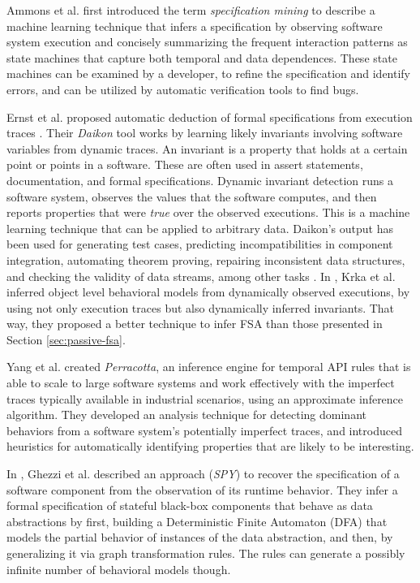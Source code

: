 Ammons et al. first introduced the term \textit{specification
mining} \cite{Ammons:2002:MS:565816.503275} to describe a machine
learning technique that infers a specification by observing
software system execution and concisely summarizing the frequent
interaction patterns as state machines that capture both temporal
and data dependences. These state machines can be examined by a
developer, to refine the specification and identify errors, and
can be utilized by automatic verification tools to find bugs.

Ernst et al. proposed automatic deduction of formal
specifications from execution traces
\cite{Ernst:1999:DDL:302405.302467}. Their \textit{Daikon} tool
works by learning likely invariants involving software variables
from dynamic traces. An invariant is a property that holds at a
certain point or points in a software. These are often used in
assert statements, documentation, and formal specifications.
Dynamic invariant detection runs a software system, observes the
values that the software computes, and then reports properties
that were \textit{true} over the observed executions.  This is a
machine learning technique that can be applied to arbitrary data.
Daikon's output has been used for generating test cases,
predicting incompatibilities in component integration, automating
theorem proving, repairing inconsistent data structures, and
checking the validity of data streams, among other tasks
\cite{Ernst200735}.  In \cite{Krka:2010:UDE:1810295.1810324},
Krka et al. inferred object level behavioral models from
dynamically observed executions, by using not only execution
traces but also dynamically inferred invariants. That way, they
proposed a better technique to infer FSA than those presented in
Section \ref{sec:passive-fsa}.

Yang et al. \cite{Yang:2006:PMT:1134285.1134325} created
\textit{Perracotta}, an inference engine for temporal API rules
that is able to scale to large software systems and work
effectively with the imperfect traces typically available in
industrial scenarios, using an approximate inference algorithm.
They developed an analysis technique for detecting dominant
behaviors from a software system's potentially imperfect traces,
and introduced heuristics for automatically identifying
properties that are likely to be interesting.

In \cite{Ghezzi:2009:SIB:1555001.1555057}, Ghezzi et al.
described an approach (\textit{SPY}) to recover the specification
of a software component from the observation of its runtime
behavior. They infer a formal specification of stateful black-box
components that behave as data abstractions by first, building a
Deterministic Finite Automaton (DFA) that models the partial
behavior of instances of the data abstraction, and then, by
generalizing it via graph transformation rules. The rules can
generate a possibly infinite number of behavioral models though.

